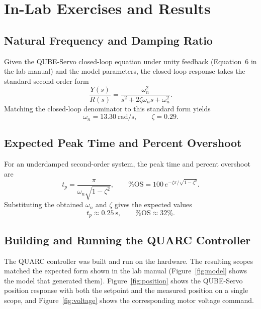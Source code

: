 \documentclass[11pt]{article}
\begin{document}
\section{In-Lab Exercises and Results}

\subsection{Natural Frequency and Damping Ratio}
Given the QUBE-Servo closed-loop equation under unity feedback (Equation~6 in the lab
manual) and the model parameters, the closed-loop response takes the standard second-order
form
\begin{equation}
    \frac{Y(s)}{R(s)} = \frac{\omega_n^{2}}{s^{2} + 2\zeta\omega_n s + \omega_n^{2}}.
    \label{eq:secondorder}
\end{equation}
Matching the closed-loop denominator to this standard form yields
\begin{equation}
    \omega_n = \SI{13.30}{\radian\per\second}, \qquad \zeta = 0.29 .
\end{equation}

\subsection{Expected Peak Time and Percent Overshoot}
For an underdamped second-order system, the peak time and percent overshoot are
\begin{equation}
    t_p = \frac{\pi}{\omega_n\sqrt{1-\zeta^{2}}},
    \qquad
    \%\mathrm{OS} = 100\,e^{-\zeta\pi/\sqrt{1-\zeta^{2}}} .
    \label{eq:tp_os}
\end{equation}
Substituting the obtained $\omega_n$ and $\zeta$ gives the expected values
\begin{equation}
    t_p \approx \SI{0.25}{\second}, \qquad \%\mathrm{OS} \approx 32\% .
\end{equation}

\subsection{Building and Running the QUARC Controller}
The QUARC controller was built and run on the hardware. The resulting scopes matched the
expected form shown in the lab manual (Figure~\ref{fig:model} shows the model that
generated them). Figure~\ref{fig:position} shows the QUBE-Servo position response with both
the setpoint and the measured position on a single scope, and Figure~\ref{fig:voltage}
shows the corresponding motor voltage command.
\end{document}
